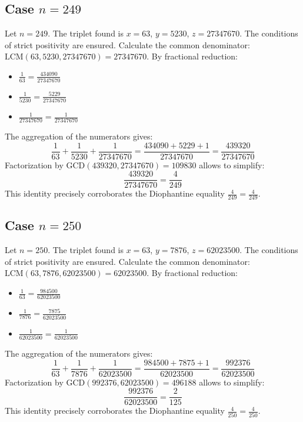 \documentclass[11pt,a4paper]{article}
\begin{document}
\subsection{Case $n = 249$}
Let $n = 249$. The triplet found is $x = 63$, $y = 5230$, $z = 27347670$.
The conditions of strict positivity are ensured.
Calculate the common denominator: $\text{LCM}(63, 5230, 27347670) = 27347670$.
By fractional reduction:
\begin{itemize}
    \item $\frac{1}{63} = \frac{434090}{27347670}$
    \item $\frac{1}{5230} = \frac{5229}{27347670}$
    \item $\frac{1}{27347670} = \frac{1}{27347670}$
\end{itemize}
The aggregation of the numerators gives:
$$ \frac{1}{63} + \frac{1}{5230} + \frac{1}{27347670} = \frac{434090 + 5229 + 1}{27347670} = \frac{439320}{27347670} $$
Factorization by $\text{GCD}(439320, 27347670) = 109830$ allows to simplify:
$$ \frac{439320}{27347670} = \frac{4}{249} $$
This identity precisely corroborates the Diophantine equality $\frac{4}{249} = \frac{4}{249}$.

\subsection{Case $n = 250$}
Let $n = 250$. The triplet found is $x = 63$, $y = 7876$, $z = 62023500$.
The conditions of strict positivity are ensured.
Calculate the common denominator: $\text{LCM}(63, 7876, 62023500) = 62023500$.
By fractional reduction:
\begin{itemize}
    \item $\frac{1}{63} = \frac{984500}{62023500}$
    \item $\frac{1}{7876} = \frac{7875}{62023500}$
    \item $\frac{1}{62023500} = \frac{1}{62023500}$
\end{itemize}
The aggregation of the numerators gives:
$$ \frac{1}{63} + \frac{1}{7876} + \frac{1}{62023500} = \frac{984500 + 7875 + 1}{62023500} = \frac{992376}{62023500} $$
Factorization by $\text{GCD}(992376, 62023500) = 496188$ allows to simplify:
$$ \frac{992376}{62023500} = \frac{2}{125} $$
This identity precisely corroborates the Diophantine equality $\frac{4}{250} = \frac{4}{250}$.
\end{document}
